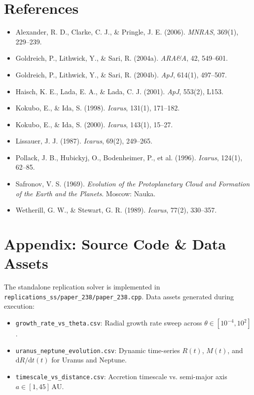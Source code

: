 \documentclass[11pt,a4paper]{article}
\begin{document}
\section*{References}
\begin{itemize}
    \item Alexander, R. D., Clarke, C. J., \& Pringle, J. E. (2006). \textit{MNRAS}, 369(1), 229--239.
    \item Goldreich, P., Lithwick, Y., \& Sari, R. (2004a). \textit{ARA\&A}, 42, 549--601.
    \item Goldreich, P., Lithwick, Y., \& Sari, R. (2004b). \textit{ApJ}, 614(1), 497--507.
    \item Haisch, K. E., Lada, E. A., \& Lada, C. J. (2001). \textit{ApJ}, 553(2), L153.
    \item Kokubo, E., \& Ida, S. (1998). \textit{Icarus}, 131(1), 171--182.
    \item Kokubo, E., \& Ida, S. (2000). \textit{Icarus}, 143(1), 15--27.
    \item Lissauer, J. J. (1987). \textit{Icarus}, 69(2), 249--265.
    \item Pollack, J. B., Hubickyj, O., Bodenheimer, P., et al. (1996). \textit{Icarus}, 124(1), 62--85.
    \item Safronov, V. S. (1969). \textit{Evolution of the Protoplanetary Cloud and Formation of the Earth and the Planets}. Moscow: Nauka.
    \item Wetherill, G. W., \& Stewart, G. R. (1989). \textit{Icarus}, 77(2), 330--357.
\end{itemize}

\appendix
\section*{Appendix: Source Code \& Data Assets}
The standalone replication solver is implemented in \texttt{replications\_ss/paper\_238/paper\_238.cpp}. Data assets generated during execution:
\begin{itemize}
    \item \texttt{growth\_rate\_vs\_theta.csv}: Radial growth rate sweep across $\theta \in [10^{-4}, 10^2]$.
    \item \texttt{uranus\_neptune\_evolution.csv}: Dynamic time-series $R(t)$, $M(t)$, and $\mathrm{d}R/\mathrm{d}t(t)$ for Uranus and Neptune.
    \item \texttt{timescale\_vs\_distance.csv}: Accretion timescale vs. semi-major axis $a \in [1, 45]\,\text{AU}$.
\end{itemize}
\end{document}
